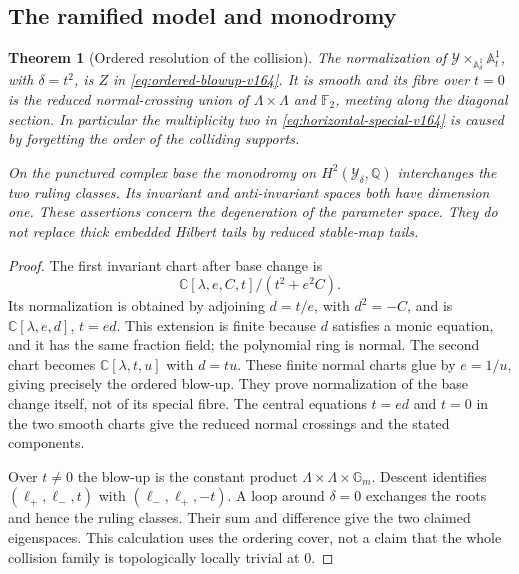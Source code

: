 \documentclass[11pt,reqno]{amsart}
\numberwithin{equation}{section}
\newtheorem{theorem}{Theorem}[section]
\theoremstyle{definition}\newtheorem{definition}[theorem]{Definition}
\theoremstyle{remark}\newtheorem{remark}[theorem]{Remark}
\newcommand{\C}{\mathbb C}\newcommand{\Q}{\mathbb Q}
\begin{document}
\subsection{The ramified model and monodromy}
\begin{theorem}[Ordered resolution of the collision]
\label{thm:ordered-resolution-v164}
The normalization of
$\mathcal Y\times_{\mathbb A^1_\delta}\mathbb A^1_t$, with
$\delta=t^2$, is $Z$ in \eqref{eq:ordered-blowup-v164}.
It is smooth and its fibre over $t=0$ is the reduced normal-crossing
union of $\Lambda\times\Lambda$ and $\mathbb F_2$, meeting along
the diagonal section. In particular the multiplicity two in
\eqref{eq:horizontal-special-v164} is caused by forgetting the order
of the colliding supports.

On the punctured complex base the monodromy on
$H^2(\mathcal Y_\delta,\mathbb Q)$ interchanges the two ruling
classes. Its invariant and anti-invariant spaces both have dimension
one. These assertions concern the degeneration of the parameter
space. They do not replace thick embedded Hilbert tails by reduced
stable-map tails.
\end{theorem}
\begin{proof}
The first invariant chart after base change is
\[
 \C[\lambda,e,C,t]/(t^2+e^2C).
\]
Its normalization is obtained by adjoining $d=t/e$, with
$d^2=-C$, and is $\C[\lambda,e,d]$, $t=ed$. This extension is
finite because $d$ satisfies a monic equation, and it has the same
fraction field; the polynomial ring is normal. The second chart
becomes $\C[\lambda,t,u]$ with $d=tu$. These finite normal charts
glue by $e=1/u$, giving precisely the ordered blow-up. They prove
normalization of the base change itself, not of its special fibre.
The central equations $t=ed$ and $t=0$ in the two smooth charts
give the reduced normal crossings and the stated components.

Over $t\ne0$ the blow-up is the constant product
$\Lambda\times\Lambda\times\mathbb G_m$. Descent identifies
$(\ell_+,\ell_-,t)$ with $(\ell_-,\ell_+,-t)$.
A loop around $\delta=0$ exchanges the roots and hence the ruling
classes. Their sum and difference give the two claimed eigenspaces.
This calculation uses the ordering cover, not a claim that the
whole collision family is topologically locally trivial at $0$.
\end{proof}
\end{document}
